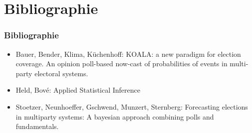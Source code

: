 \documentclass[aspectratio=169,xcolor=dvipsnames]{beamer}
\begin{document}
\section{Bibliographie}
\begin{frame}
\frametitle{Bibliographie}
\begin{itemize}
\item Bauer, Bender, Klima, Küchenhoff: KOALA: a new paradigm
for election coverage. An opinion poll-based now-cast of probabilities of events in multi-party electoral systems.
\item Held, Bov\'{e}: Applied Statistical Inference
\item Stoetzer, Neunhoeffer, Gschwend, Munzert, Sternberg: Forecasting elections in multiparty systems: A bayesian approach combining polls and fundamentals.
\end{itemize}
\end{frame}
\end{document}
